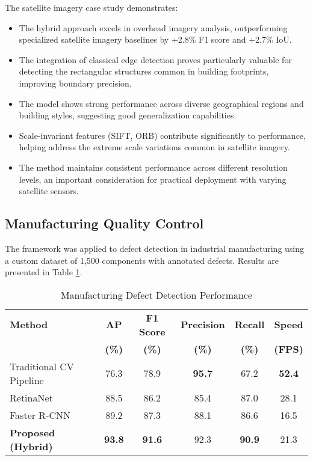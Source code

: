 The satellite imagery case study demonstrates:

\begin{itemize}
    \item The hybrid approach excels in overhead imagery analysis, outperforming specialized satellite imagery baselines by +2.8\% F1 score and +2.7\% IoU.
    
    \item The integration of classical edge detection proves particularly valuable for detecting the rectangular structures common in building footprints, improving boundary precision.
    
    \item The model shows strong performance across diverse geographical regions and building styles, suggesting good generalization capabilities.
    
    \item Scale-invariant features (SIFT, ORB) contribute significantly to performance, helping address the extreme scale variations common in satellite imagery.
    
    \item The method maintains consistent performance across different resolution levels, an important consideration for practical deployment with varying satellite sensors.
\end{itemize}

\subsection{Manufacturing Quality Control}
The framework was applied to defect detection in industrial manufacturing using a custom dataset of 1,500 components with annotated defects. Results are presented in Table \ref{tab:manufacturing_results}.

\begin{table}[h]
\centering
\caption{Manufacturing Defect Detection Performance}
\label{tab:manufacturing_results}
\begin{tabular}{lccccc}
\hline
\textbf{Method} & \textbf{AP} & \textbf{F1 Score} & \textbf{Precision} & \textbf{Recall} & \textbf{Speed} \\
 & \textbf{(\%)} & \textbf{(\%)} & \textbf{(\%)} & \textbf{(\%)} & \textbf{(FPS)} \\
\hline
Traditional CV Pipeline & 76.3 & 78.9 & \textbf{95.7} & 67.2 & \textbf{52.4} \\
RetinaNet & 88.5 & 86.2 & 85.4 & 87.0 & 28.1 \\
Faster R-CNN & 89.2 & 87.3 & 88.1 & 86.6 & 16.5 \\
\hline
\textbf{Proposed (Hybrid)} & \textbf{93.8} & \textbf{91.6} & 92.3 & \textbf{90.9} & 21.3 \\
\hline
\end{tabular}
\end{table}

